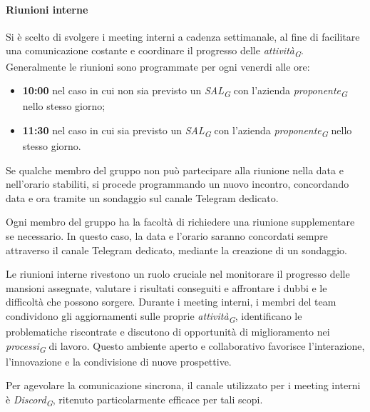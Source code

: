 \paragraph{Riunioni interne}
Si è scelto di svolgere i meeting interni a cadenza settimanale, al fine di facilitare una comunicazione costante e coordinare il progresso delle \textit{attività}\textsubscript{\textit{G}}. \\

Generalmente le riunioni sono programmate per ogni venerdi alle ore:
\begin{itemize}
		\item \textbf{10:00} nel caso in cui non sia previsto un \textit{SAL}\textsubscript{\textit{G}} con l'azienda \textit{proponente}\textsubscript{\textit{G}} nello stesso giorno;
		\item \textbf{11:30} nel caso in cui sia previsto un \textit{SAL}\textsubscript{\textit{G}} con l'azienda \textit{proponente}\textsubscript{\textit{G}} nello stesso giorno.
\end{itemize}
Se qualche membro del gruppo non può partecipare alla riunione nella data e nell'orario stabiliti, si procede programmando un nuovo incontro, concordando data e ora tramite un sondaggio sul canale Telegram dedicato.

\vspace{0.2cm}

Ogni membro del gruppo ha la facoltà di richiedere una riunione supplementare se necessario. In questo caso, la data e l'orario saranno concordati sempre attraverso il canale Telegram dedicato, mediante la creazione di un sondaggio.

\vspace{0.2cm}

Le riunioni interne rivestono un ruolo cruciale nel monitorare il progresso delle mansioni assegnate, valutare i risultati conseguiti e affrontare i dubbi e le difficoltà che possono sorgere. Durante i meeting interni, i membri del team condividono gli aggiornamenti sulle proprie \textit{attività}\textsubscript{\textit{G}}, identificano le problematiche riscontrate e discutono di opportunità di miglioramento nei \textit{processi}\textsubscript{\textit{G}} di lavoro. Questo ambiente aperto e collaborativo favorisce l'interazione, l'innovazione e la condivisione di nuove prospettive.

\vspace{0.2cm}

Per agevolare la comunicazione sincrona, il canale utilizzato per i meeting interni è \textit{Discord}\textsubscript{\textit{G}}, ritenuto particolarmente efficace per tali scopi.


